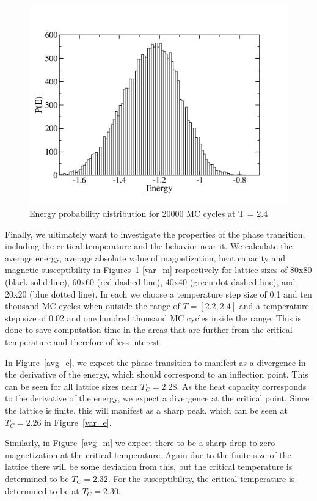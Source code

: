 \documentclass[prc,amsmath,twocolumn,superscriptaddress]{revtex4}
\begin{document}
\begin{figure}[t]
\includegraphics[scale=0.33]{ei_2.pdf}
\caption{Energy probability distribution for 20000 MC cycles at T = 2.4}
\label{ei_2}
\end{figure}

Finally, we ultimately want to investigate the properties of the phase transition, including the critical temperature and the behavior near it. We calculate the average energy, average absolute value of magnetization, heat capacity and magnetic susceptibility in Figures~\ref{ei_2}-\ref{var_m} respectively for lattice sizes of 80x80 (black solid line), 60x60 (red dashed line), 40x40 (green dot dashed line), and 20x20 (blue dotted line). In each we choose a temperature step size of 0.1 and ten thousand MC cycles when outside the range of $T=[2.2,2.4]$ and a temperature step size of 0.02 and one hundred thousand MC cycles inside the range. This is done to save computation time in the areas that are further from the critical temperature and therefore of less interest.

In Figure~\ref{avg_e}, we expect the phase transition to manifest as a divergence in the derivative of the energy, which should correspond to an inflection point. This can be seen for all lattice sizes near $T_C=2.28$. As the heat capacity corresponds to the derivative of the energy, we expect a divergence at the critical point. Since the lattice is finite, this will manifest as a sharp peak, which can be seen at $T_C=2.26$ in Figure~\ref{var_e}.

Similarly, in Figure~\ref{avg_m} we expect there to be a sharp drop to zero magnetization at the critical temperature. Again due to the finite size of the lattice there will be some deviation from this, but the critical temperature is determined to be $T_C=2.32$. For the susceptibility, the critical temperature is determined to be at $T_C=2.30$.
\end{document}
